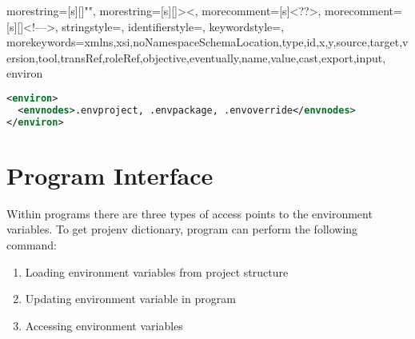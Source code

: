 \documentclass[design.tex]{subfiles}
\begin{document}
{
	morestring=[s][\color{mauve}]{"}{"},
	morestring=[s][\color{black}]{>}{<},
	morecomment=[s]{<?}{?>},
	morecomment=[s][\color{dkgreen}]{<!--}{-->},
	stringstyle=\color{black},
	identifierstyle=\color{DarkBlue},
	keywordstyle=\color{red},
	morekeywords={xmlns,xsi,noNamespaceSchemaLocation,type,id,x,y,source,target,version,tool,transRef,roleRef,objective,eventually,name,value,cast,export,input, environ}%
}

\begin{lstlisting}[language=XML, label=lst:env_config, caption=Example for project configuration environment file]
<environ>
  <envnodes>.envproject, .envpackage, .envoverride</envnodes>
</environ>
\end{lstlisting}

\section{Program Interface}
Within programs there are three types of access points to the environment variables.
To get projenv dictionary, program can perform the following command:
\begin{enumerate}
	\item Loading environment variables from project structure
	\item Updating environment variable in program
	\item Accessing environment variables
\end{enumerate}
\end{document}
